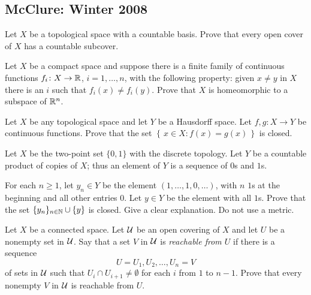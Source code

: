 \subsection{McClure: Winter 2008}
\setcounter{exercise}{0}

\begin{problem}
  Let $X$ be a topological space with a countable basis. Prove that every
  open cover of $X$ has a countable subcover.
\end{problem}
\begin{solution}

\end{solution}

\begin{problem}
  Let $X$ be a compact space and suppose there is a finite family of
  continuous functions $f_i\colon X\to\mathbb{R}$, $i=1,\ldots,n$, with the
  following property: given $x\neq y$ in $X$ there is an $i$ such that
  $f_i(x)\neq f_i(y)$. Prove that $X$ is homeomorphic to a subspace of
  $\mathbb{R}^n$.
\end{problem}
\begin{solution}
\end{solution}

\begin{problem}
  Let $X$ be any topological space and let $Y$ be a Hausdorff space. Let
  $f,g\colon X\to Y$ be continuous functions. Prove that the set
  $\left\{\,x\in X:f(x)=g(x)\,\right\}$ is closed.
\end{problem}
\begin{solution}
\end{solution}

\begin{problem}
  Let $X$ be the two-point set $\{0,1\}$ with the discrete topology. Let
  $Y$ be a countable product of copies of $X$; thus an element of $Y$ is a
  sequence of $0$s and $1$s.

  For each $n\geq 1$, let $y_n\in Y$ be the element
  $(1,\ldots,1,0,\ldots)$, with $n$ $1$s at the beginning and all other
  entries $0$. Let $y\in Y$ be the element with all $1$s. Prove that the
  set $\{y_n\}_{n\in\mathbb{N}}\cup\{y\}$ is closed. Give a clear explanation. Do
  not use a metric.
\end{problem}
\begin{solution}
\end{solution}

\begin{problem}
  Let $X$ be a connected space. Let $\mathcal{U}$ be an open covering of $X$ and
  let $U$ be a nonempty set in $\mathcal{U}$. Say that a set $V$ in $\mathcal{U}$ is
  \emph{reachable from $U$} if there is a sequence
  \[
    U=U_1,U_2,\ldots,U_n=V
  \]
  of sets in $\mathcal{U}$ such that $U_i\cap U_{i+1}\neq\emptyset$ for each $i$
  from $1$ to $n-1$. Prove that every nonempty $V$ in $\mathcal{U}$ is reachable
  from $U$.
\end{problem}
\begin{solution}
\end{solution}

